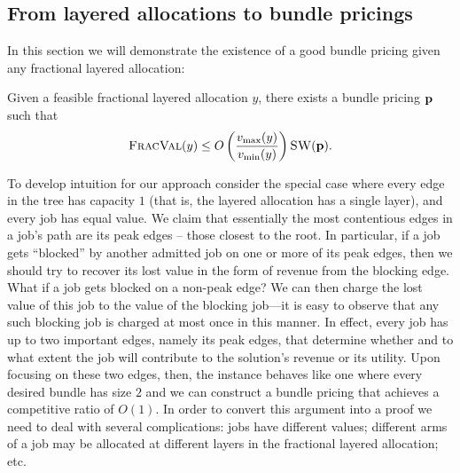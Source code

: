 \subsection{From layered allocations to bundle pricings}
\label{sec:trees-unit-cap}

In this section we will demonstrate the existence of a good bundle
pricing given any fractional layered allocation:

\begin{lemma}
\label{lem:single-value-class}
    Given a feasible fractional layered allocation $y$, there exists a bundle
    pricing $\mathbf{p}$ such that
    \[
        {\normalfont\textsc{FracVal}}(y) \le O\left(\frac{v_{\max}(y)}{v_{\min}(y)}\right) {\normalfont\textsc{SW}}(\mathbf{p}).
    \]
\end{lemma}

To develop intuition for our approach consider the special case where
every edge in the tree has capacity $1$ (that is, the layered
allocation has a single layer), and every job has equal value. We
claim that essentially the most contentious edges in a job's path are
its peak edges -- those closest to the root. In particular, if a job
gets ``blocked'' by another admitted job on one or more of its peak
edges, then we should try to recover its lost value in the form of
revenue from the blocking edge. What if a job gets blocked on a
non-peak edge? We can then charge the lost value of this job to the
value of the blocking job---it is easy to observe that any such
blocking job is charged at most once in this manner. In effect, every
job has up to two important edges, namely its peak edges, that
determine whether and to what extent the job will contribute to the
solution's revenue or its utility. Upon focusing on these two edges,
then, the instance behaves like one where every desired bundle has
size $2$ and we can construct a bundle pricing that achieves a
competitive ratio of $O(1)$. In order to convert this argument into a
proof we need to deal with several complications: jobs have different
values; different arms of a job may be allocated at different layers
in the fractional layered allocation; etc.

